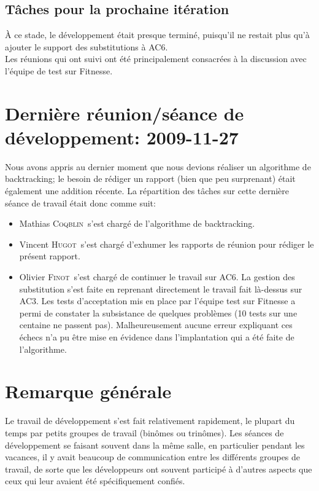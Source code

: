 \documentclass[a4paper,12pt]{article}
\def\familyname{\textsc}
\def\firstname#1{#1}
\def\groupmember#1#2{\firstname{#1} \familyname{#2}}
\def\mmat{\groupmember{Mathias}{Coqblin}}
\def\moli{\groupmember{Olivier}{Finot}}
\def\mvin{\groupmember{Vincent}{Hugot}}
\begin{document}
\subsection{Tâches pour la prochaine itération}

\`A ce stade, le développement était presque terminé, puisqu'il
 ne restait plus qu'à ajouter le support des substitutions à AC6.\mk\\
%
Les réunions qui ont suivi ont été principalement consacrées à
la discussion avec l'équipe de test sur Fitnesse.


\section{Dernière réunion/séance de développement: 2009-11-27}

Nous avons appris au dernier moment que nous devions réaliser 
un algorithme de backtracking; le besoin de rédiger un rapport
(bien que peu surprenant) était également une addition récente.
La répartition des tâches sur cette dernière séance de 
travail était donc comme suit: 
\begin{itemize}
 \item \mmat\ s'est chargé de l'algorithme de backtracking.
\item \mvin\ s'est chargé d'exhumer les rapports de réunion pour
rédiger le présent rapport.
\item \moli\ s'est chargé de continuer le travail sur AC6.
La gestion des substitution s'est faite en reprenant directement le travail fait là-dessus sur AC3.
Les tests d'acceptation mis en place par l'équipe test sur Fitnesse a permi de constater la subsistance de quelques problèmes (10 tests sur une centaine ne passent pas).
Malheureusement aucune erreur expliquant ces échecs n'a pu être mise en évidence dans l'implantation qui a été faite de l'algorithme.
\end{itemize}

\section{Remarque générale}

Le travail de développement s'est fait relativement rapidement, 
le plupart du temps par petits groupes de travail (binômes ou trinômes).
Les séances de développement se faisant souvent dans la même salle,
en particulier pendant les vacances,
il y avait beaucoup de communication entre les différents groupes de travail,
de sorte que les développeurs ont souvent 
participé à d'autres aspects que ceux qui leur avaient été spécifiquement
confiés.
\end{document}
